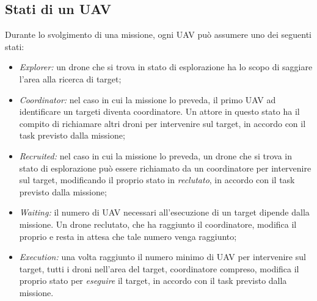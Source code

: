 \subsection{Stati di un UAV}

Durante lo svolgimento di una missione, ogni UAV può assumere uno dei seguenti stati:

\begin{itemize}
    \item \textit{Explorer:} un drone che si trova in stato di esplorazione ha lo scopo di saggiare l'area alla ricerca di target;
    \item \textit{Coordinator:} nel caso in cui la missione lo preveda, il primo UAV ad identificare un targeti diventa coordinatore. Un attore in questo stato ha il compito di richiamare altri droni per intervenire sul target, in accordo con il task previsto dalla missione;
    \item \textit{Recruited:} nel caso in cui la missione lo preveda, un drone che si trova in stato di esplorazione può essere richiamato da un coordinatore per intervenire sul target, modificando il proprio stato in \textit{reclutato}, in accordo con il task previsto dalla missione;
    \item \textit{Waiting:} il numero di UAV necessari all'esecuzione di un target dipende dalla missione. Un drone reclutato, che ha raggiunto il coordinatore, modifica il proprio e resta in attesa che tale numero venga raggiunto;
    \item \textit{Execution:} una volta raggiunto il numero minimo di UAV per intervenire sul target, tutti i droni nell'area del target, coordinatore compreso, modifica il proprio stato per \textit{eseguire} il target, in accordo con il task previsto dalla missione.

\end{itemize}

